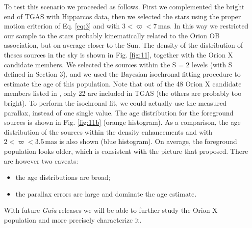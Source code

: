 \documentclass[onecolumn]{aa} %
\begin{document}
To test this  scenario we proceeded as follows.
First we complemented the bright end of TGAS with Hipparcos data, then we selected the stars using the proper motion criterion of Eq. \eqref{eq:3} and with $3 <\varpi < 7 \,\mathrm{mas}$. In this way we restricted our sample to the  stars probably kinematically related to the Orion OB association, but on average closer to the Sun.  The density of the distribution of theses sources in the sky is shown in Fig. \ref{fig:11}, together with the Orion X candidate members. We selected the sources within the S = 2 levels (with S defined in Section 3), and we used the Bayesian isochronal fitting procedure to estimate the age of this population. 
Note that out of the 48 Orion X candidate members listed in \cite{Bouy2015}, only 22 are included in TGAS (the others are probably too bright).
To perform the isochronal fit, we could actually use the measured parallax, instead of one single value. The age distribution for the foreground sources is shown in Fig. \ref{fig:11b} (orange histogram). As a comparison, the age distribution of the sources within the density enhancements and with $2 < \varpi < 3.5 \, \mathrm{mas}$ is also shown (blue histogram). On average, the foreground population looks older, which is consistent with the picture that \cite{Bouy2015} proposed. There are however two caveats: 
\begin{itemize}
\item the age distributions are broad;
\item  the parallax errors are large and dominate the age estimate. 
\end{itemize}
With future \textit{Gaia} releases we will be able to further study the Orion X population and more precisely characterize it.
\end{document}
